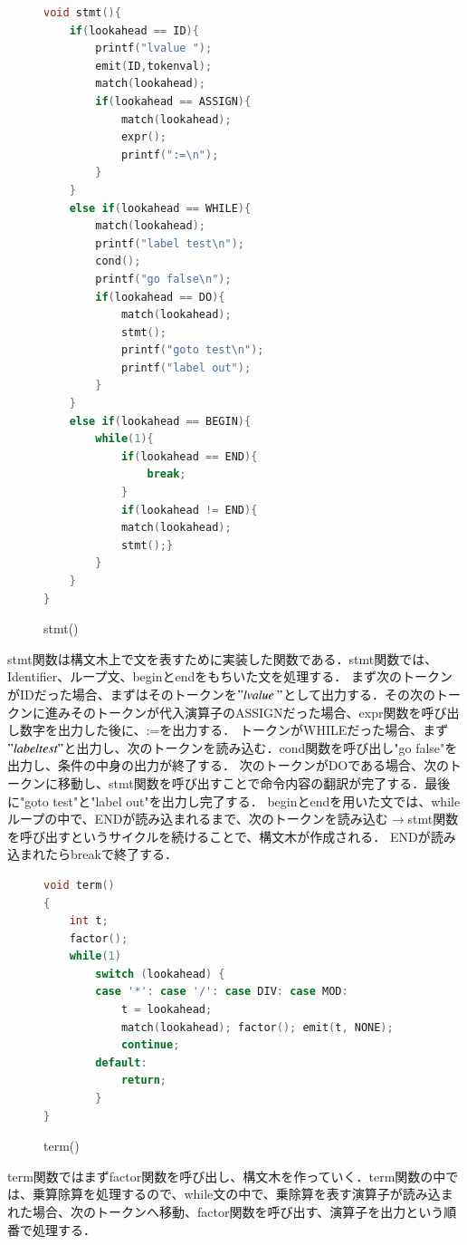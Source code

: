 \documentclass[fleqn, a4paper. 12pt]{ltjsarticle} %
\begin{document}
  \begin{figure}[H]
    \centering
    \begin{lstlisting}[language=C, caption={}, label=sample-code]
      void stmt(){
	if(lookahead == ID){
		printf("lvalue ");
		emit(ID,tokenval);
		match(lookahead);
		if(lookahead == ASSIGN){
			match(lookahead);
			expr();
			printf(":=\n");
		}
	}
	else if(lookahead == WHILE){
		match(lookahead);
		printf("label test\n");
		cond();
		printf("go false\n");
		if(lookahead == DO){
			match(lookahead);
			stmt();
			printf("goto test\n");
			printf("label out");
		}
	}
	else if(lookahead == BEGIN){
		while(1){
			if(lookahead == END){
				break;
			}
			if(lookahead != END){
			match(lookahead);
			stmt();}
		}
	}
}
    \end{lstlisting}
    \caption{stmt()}
    \label{stmt}
  \end{figure}
  stmt関数は構文木上で文を表すために実装した関数である．stmt関数では、Identifier、ループ文、beginとendをもちいた文を処理する．
  まず次のトークンがIDだった場合、まずはそのトークンを$"lvalue ~"$として出力する．その次のトークンに進みそのトークンが代入演算子のASSIGNだった場合、expr関数を呼び出し数字を出力した後に、:=を出力する．
  トークンがWHILEだった場合、まず$"label test"$と出力し、次のトークンを読み込む．cond関数を呼び出し"go false"を出力し、条件の中身の出力が終了する．
  次のトークンがDOである場合、次のトークンに移動し、stmt関数を呼び出すことで命令内容の翻訳が完了する．最後に"goto test"と"label out"を出力し完了する．
  beginとendを用いた文では、whileループの中で、ENDが読み込まれるまで、次のトークンを読み込む$\rightarrow$stmt関数を呼び出すというサイクルを続けることで、構文木が作成される．
  ENDが読み込まれたらbreakで終了する．

  \begin{figure}[H]
    \centering
    \begin{lstlisting}[language=C, caption={}, label=sample-code]
      void term()
{
	int t;
	factor();
	while(1)
		switch (lookahead) {
		case '*': case '/': case DIV: case MOD:
			t = lookahead;
			match(lookahead); factor(); emit(t, NONE);
			continue;
		default:
			return;
		}
}
    \end{lstlisting}
    \caption{term()}
    \label{term}
  \end{figure}
  term関数ではまずfactor関数を呼び出し、構文木を作っていく．term関数の中では、乗算除算を処理するので、while文の中で、乗除算を表す演算子が読み込まれた場合、次のトークンへ移動、factor関数を呼び出す、演算子を出力という順番で処理する．
  
\end{document}
